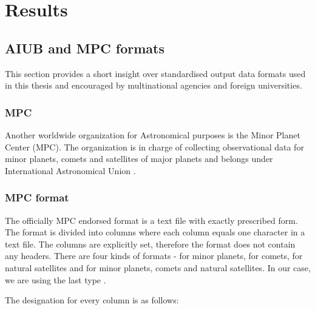 \chapter{Results}\label{chap:results}

\section{AIUB and MPC formats}\label{sec:tdm_ccsds}

	This section provides a short insight over standardised output data formats used in this thesis and encouraged by multinational agencies and foreign universities. 
		
\subsection{MPC}\label{sec:mpc}

	Another worldwide organization for Astronomical purposes is the Minor Planet Center (MPC). The organization is in charge of collecting observational data for minor planets, comets and satellites of major planets and belongs under International Astronomical Union \citep{mpc}.
	
\subsection{MPC format}

	The officially MPC endorsed format is a text file with exactly prescribed form. The format is divided into columns where each column equals one character in a text file. The columns are explicitly set, therefore the format does not contain any headers. There are four kinds of formats - for minor planets, for comets, for natural satellites and for minor planets, comets and natural satellites. In our case, we are using the last type \citep{mpc}.
	
	The designation for every column is as follows:
	
